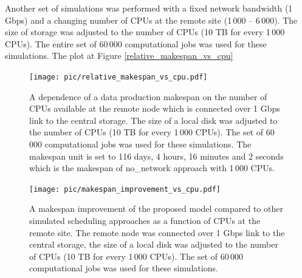 \documentclass{svjour3}                     %
\begin{document}
Another set of simulations was performed with a fixed network bandwidth (1 Gbps) and a changing number of CPUs at the remote site (1\,000 -- 6\,000). The size of storage was adjusted to the number of CPUs (10 TB for every 1\,000 CPUs). The entire set of 60\,000 computational jobs was used for these simulations. The plot at Figure \ref{relative_makespan_vs_cpu} 
%
\begin{figure}
\centering
\begin{minipage}{1\textwidth}
\centering
    \texttt{[image: pic/relative\_makespan\_vs\_cpu.pdf]}
    \caption{A dependence of a data production makespan on the number of CPUs available at the remote node which is connected over 1 Gbps link to the central storage. The size of a local disk was adjusted to the number of CPUs (10 TB for every 1\,000 CPUs). The set of 60\,000 computational jobs was used for these simulations. The makespan unit is set to 116 days, 4 hours, 16 minutes and 2 seconds which is the makespan of no\_network approach with 1\,000 CPUs.}
    \label{relative_makespan_vs_cpu}
\end{minipage}\hspace{3mm}%

\begin{minipage}{1\textwidth}
\centering
    \texttt{[image: pic/makespan\_improvement\_vs\_cpu.pdf]}
    \caption{A makespan improvement of the proposed model compared to other simulated scheduling approaches as a function of CPUs at the remote site. The remote node was connected over 1 Gbps link to the central storage, the size of a local disk was adjusted to the number of CPUs (10 TB for every 1\,000 CPUs). The set of 60\,000 computational jobs was used for these simulations.}
    \label{makespan_improvement_vs_cpu}
\end{minipage} 
\end{figure}
%
\end{document}
